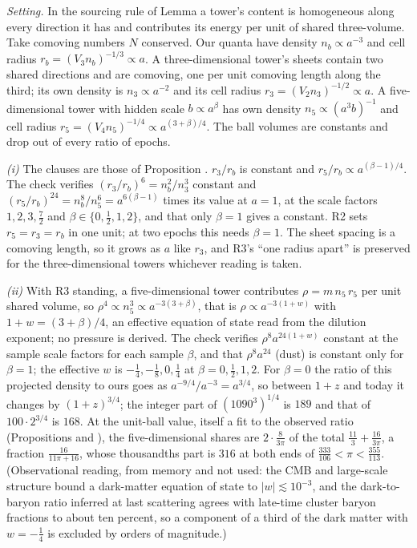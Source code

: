 \emph{Setting.} In the sourcing rule of Lemma  a tower's content is homogeneous along every direction it has and contributes its energy per unit of shared three-volume. Take comoving numbers $N$ conserved. Our quanta have density $n_{b} \propto a^{-3}$ and cell radius $r_{b} = (V_{3}n_{b})^{-1/3} \propto a$. A three-dimensional tower's sheets contain two shared directions and are comoving, one per unit comoving length along the third; its own density is $n_{3} \propto a^{-2}$ and its cell radius $r_{3} = (V_{2}n_{3})^{-1/2} \propto a$. A five-dimensional tower with hidden scale $b \propto a^{\beta}$ has own density $n_{5} \propto (a^{3}b)^{-1}$ and cell radius $r_{5} = (V_{4}n_{5})^{-1/4} \propto a^{(3 + \beta)/4}$. The ball volumes are constants and drop out of every ratio of epochs.

\emph{(i)} The clauses are those of Proposition . $r_{3}/r_{b}$ is constant and $r_{5}/r_{b} \propto a^{(\beta - 1)/4}$. The check verifies $(r_{3}/r_{b})^{6} = n_{b}^{2}/n_{3}^{3}$ constant and $(r_{5}/r_{b})^{24} = n_{b}^{8}/n_{5}^{6} = a^{6(\beta - 1)}$ times its value at $a = 1$, at the scale factors $1, 2, 3, \tfrac72$ and $\beta \in \{0, \tfrac12, 1, 2\}$, and that only $\beta = 1$ gives a constant. R2 sets $r_{5} = r_{3} = r_{b}$ in one unit; at two epochs this needs $\beta = 1$. The sheet spacing is a comoving length, so it grows as $a$ like $r_{3}$, and R3's ``one radius apart'' is preserved for the three-dimensional towers whichever reading is taken.

\emph{(ii)} With R3 standing, a five-dimensional tower contributes $\rho = m\,n_{5}\,r_{5}$ per unit shared volume, so $\rho^{4} \propto n_{5}^{3} \propto a^{-3(3 + \beta)}$, that is $\rho \propto a^{-3(1 + w)}$ with $1 + w = (3 + \beta)/4$, an effective equation of state read from the dilution exponent; no pressure is derived. The check verifies $\rho^{8}a^{24(1 + w)}$ constant at the sample scale factors for each sample $\beta$, and that $\rho^{8}a^{24}$ (dust) is constant only for $\beta = 1$; the effective $w$ is $-\tfrac14, -\tfrac18, 0, \tfrac14$ at $\beta = 0, \tfrac12, 1, 2$. For $\beta = 0$ the ratio of this projected density to ours goes as $a^{-9/4}/a^{-3} = a^{3/4}$, so between $1 + z$ and today it changes by $(1 + z)^{3/4}$; the integer part of $(1090^{3})^{1/4}$ is $189$ and that of $100 \cdot 2^{3/4}$ is $168$. At the unit-ball value, itself a fit to the observed ratio (Propositions  and ), the five-dimensional shares are $2 \cdot \tfrac{8}{3\pi}$ of the total $\tfrac{11}{3} + \tfrac{16}{3\pi}$, a fraction $\tfrac{16}{11\pi + 16}$, whose thousandths part is $316$ at both ends of $\tfrac{333}{106} < \pi < \tfrac{355}{113}$. (Observational reading, from memory and not used: the CMB and large-scale structure bound a dark-matter equation of state to $|w| \lesssim 10^{-3}$, and the dark-to-baryon ratio inferred at last scattering agrees with late-time cluster baryon fractions to about ten percent, so a component of a third of the dark matter with $w = -\tfrac14$ is excluded by orders of magnitude.)

